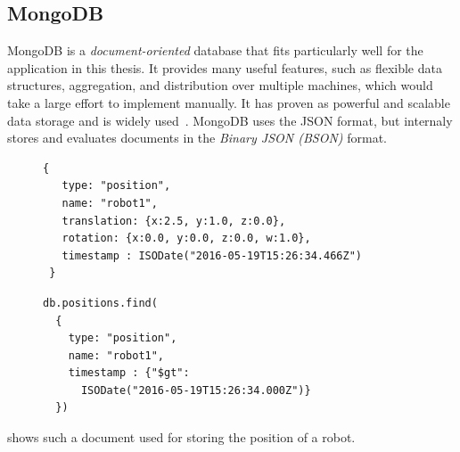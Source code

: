 \subsection{MongoDB}
\label{sec:mongodb}
MongoDB is a \emph{document-oriented} database that fits particularly
well for the application in this thesis. It provides many useful
features, such as flexible data structures, aggregation, and
distribution over multiple machines, which would take a large effort
to implement manually. It has proven as powerful and scalable data
storage and is widely used~\cite{mongodb,RoboDB}. MongoDB uses the
JSON format, but internaly stores and evaluates documents in the
\emph{Binary JSON (BSON)} format.
\begin{figure}
  \begin{minipage}{0.6\linewidth}
\begin{lstlisting}[style=SmallJSON,
  caption={MongoDB document representing\protect\\ the position of a robot},
  label=lst:mongo-document,
  framexleftmargin=2pt, xleftmargin=2pt,
 morekeywords={}, numbers=none]
 {
   type: "position",
   name: "robot1",
   translation: {x:2.5, y:1.0, z:0.0},
   rotation: {x:0.0, y:0.0, z:0.0, w:1.0},
   timestamp : ISODate("2016-05-19T15:26:34.466Z")
 }
\end{lstlisting}
  \end{minipage}
  \begin{minipage}{0.4\linewidth}
\begin{lstlisting}[style=SmallJSON,
  caption={MongoDB query yielding the document in \reflst{lst:mongo-document}},
  label=lst:mongo-query,
  framexleftmargin=2pt, xleftmargin=10pt,
 morekeywords={}, numbers=none]
db.positions.find(
  {
    type: "position",
    name: "robot1",
    timestamp : {"$gt":
      ISODate("2016-05-19T15:26:34.000Z")}
  })
\end{lstlisting}
  \end{minipage}
  \vspace{-0.8cm}
\end{figure}
 shows such a document
used for storing the position of a robot.

